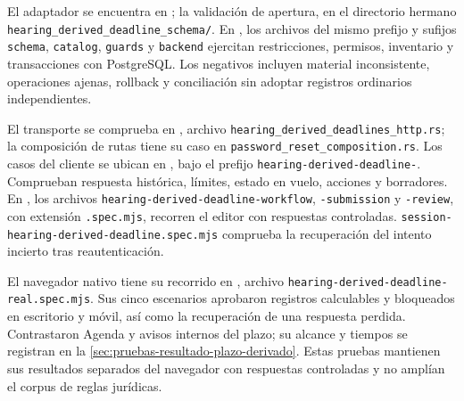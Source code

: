 {\raggedright El adaptador se encuentra en ; la validación de apertura, en el directorio hermano \texttt{hearing\_derived\_deadline\_schema/}. En , los archivos del mismo prefijo y sufijos \texttt{schema}, \texttt{catalog}, \texttt{guards} y \texttt{backend} ejercitan restricciones, permisos, inventario y transacciones con PostgreSQL. Los negativos incluyen material inconsistente, operaciones ajenas, rollback y conciliación sin adoptar registros ordinarios independientes.\par}

{\raggedright El transporte se comprueba en , archivo \texttt{hearing\_derived\_deadlines\_http.rs}; la composición de rutas tiene su caso en \texttt{password\_reset\_composition.rs}. Los casos del cliente se ubican en , bajo el prefijo \texttt{hearing-derived-deadline-}. Comprueban respuesta histórica, límites, estado en vuelo, acciones y borradores. En , los archivos \texttt{hearing-derived-deadline-workflow}, \texttt{-submission} y \texttt{-review}, con extensión \texttt{.spec.mjs}, recorren el editor con respuestas controladas. \texttt{session-hearing-derived-deadline.spec.mjs} comprueba la recuperación del intento incierto tras reautenticación.\par}

{\raggedright El navegador nativo tiene su recorrido en , archivo \texttt{hearing-derived-deadline-real.spec.mjs}. Sus cinco escenarios aprobaron registros calculables y bloqueados en escritorio y móvil, así como la recuperación de una respuesta perdida. Contrastaron Agenda y avisos internos del plazo; su alcance y tiempos se registran en la \cref{sec:pruebas-resultado-plazo-derivado}. Estas pruebas mantienen sus resultados separados del navegador con respuestas controladas y no amplían el corpus de reglas jurídicas.\par}

